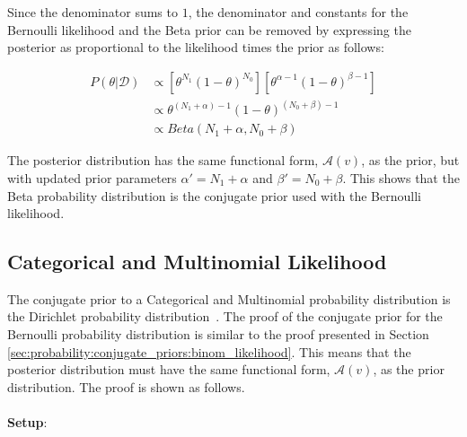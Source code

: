 Since the denominator sums to $1$, the denominator and constants for the Bernoulli likelihood and the Beta prior can be removed by expressing the posterior as proportional to the likelihood times the prior as follows:

\begin{equation}
	\label{eq:probability:conjugate_priors:binom_likelihood:posterior_propto}
	\begin{split}
		P(\theta | \boldsymbol{\mathcal{D}}) &\propto \left[\theta^{N_{1}}(1-\theta)^{N_{0}}\right] \left[\theta^{\alpha - 1} (1 - \theta)^{\beta - 1}\right] \\
		&\propto \theta^{(N_{1} + \alpha) - 1}(1-\theta)^{(N_{0} + \beta) - 1} \\
		&\propto Beta(N_{1} + \alpha, N_{0} + \beta)
	\end{split}
\end{equation}

The posterior distribution has the same functional form, $\mathcal{A}(v)$, as the prior, but with updated prior parameters $\alpha' = N_{1} + \alpha$ and $\beta' = N_{0} + \beta$. This shows that the Beta probability distribution is the conjugate prior used with the Bernoulli likelihood.


\subsection{Categorical and Multinomial Likelihood}
\label{sec:probability:conjugate_priors:cat_mult_likelihood}

The conjugate prior to a Categorical and Multinomial probability distribution is the Dirichlet probability distribution~\cite{ref:wackerly:2014}. The proof of the conjugate prior for the Bernoulli probability distribution is similar to the proof presented in Section \ref{sec:probability:conjugate_priors:binom_likelihood}. This means that the posterior distribution must have the same functional form, $\mathcal{A}(v)$, as the prior distribution. The proof is shown as follows. \\\\
\textbf{Setup}:

